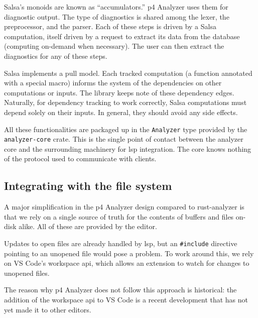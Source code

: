 Salsa's monoids are known as ``accumulators.'' \acrshort{p4} Analyzer uses them
for diagnostic output. The type of diagnostics is shared among the lexer, the
preprocessor, and the parser. Each of these steps is driven by a Salsa
computation, itself driven by a request to extract its data from the database
(computing on-demand when necessary). The user can then extract the diagnostics
for any of these steps.

Salsa implements a pull model. Each tracked computation (a function annotated
with a special macro) informs the system of the dependencies on other
computations or inputs. The library keeps note of these dependency edges.
Naturally, for dependency tracking to work correctly, Salsa computations must
depend solely on their inputs. In general, they should avoid any side effects.

All these functionalities are packaged up in the \texttt{Analyzer} type provided
by the \texttt{analyzer-core} crate. This is the single point of contact between
the analyzer core and the surrounding machinery for \acrshort{lsp} integration.
The core knows nothing of the protocol used to communicate with clients.

\subsection{Integrating with the file system}

A major simplification in the \acrshort{p4} Analyzer design compared to
rust-analyzer is that we rely on a single source of truth for the contents of
buffers and files on-disk alike. All of these are provided by the editor.

Updates to open files are already handled by \acrshort{lsp}, but an
\texttt{\#include} directive pointing to an unopened file would pose a problem.
To work around this, we rely on VS Code's workspace \acrshort{api}, which allows
an extension to watch for changes to unopened files.

The reason why \acrshort{p4} Analyzer does not follow this approach is
historical: the addition of the workspace \acrshort{api} to VS Code is a recent
development that has not yet made it to other editors.
